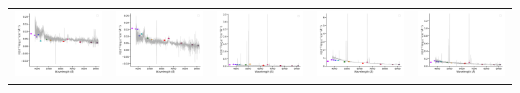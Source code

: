 \begin{center}
\begin{longtable}{l l l l l }
    \includegraphics[width=0.19\linewidth, clip]{Figs/Figs-sdss/spec-0514-51994-0016-SPLUS-n02n21-042463.pdf} & \includegraphics[width=0.19\linewidth, clip]{Figs/Figs-sdss/spec-0515-52051-0011-SPLUS-n02n22-059209.pdf} & \includegraphics[width=0.19\linewidth, clip]{Figs/Figs-sdss/spec-0519-52283-0278-SPLUS-n02n26-032045.pdf} & \includegraphics[width=0.19\linewidth, clip]{Figs/Figs-sdss/spec-0519-52283-0291-SPLUS-n02n26-039812.pdf} & \includegraphics[width=0.19\linewidth, clip]{Figs/Figs-sdss/spec-0520-52288-0312-SPLUS-n02n28-039381.pdf} \\

\end{longtable}
\end{center}
